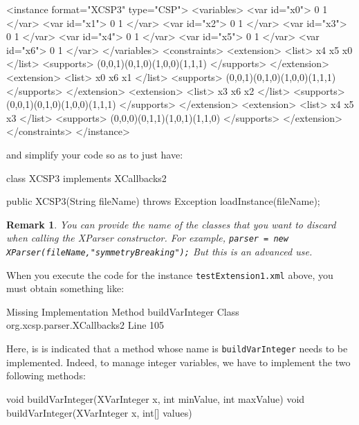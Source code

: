 \documentclass[10pt]{article}
\newenvironment{boxabsc}
               {\medskip \begin{bclogo}[barre=none,arrondi=0.2,logo=]{}\vspace{-0.6cm}}
               {\vspace{-0.1cm}\end{bclogo} \smallskip}
\newtheorem{remark}{Remark}
\newcommand{\nn}[1]{{\tt #1}} %
\begin{document}
\begin{boxabsc}
\begin{absc}
<instance format="XCSP3" type="CSP">
  <variables>
    <var id="x0"> 0 1 </var>
    <var id="x1"> 0 1 </var>
    <var id="x2"> 0 1 </var>
    <var id="x3"> 0 1 </var>
    <var id="x4"> 0 1 </var>
    <var id="x5"> 0 1 </var>
    <var id="x6"> 0 1 </var>
  </variables>
  <constraints>
    <extension>
      <list> x4 x5 x0 </list>
      <supports> (0,0,1)(0,1,0)(1,0,0)(1,1,1) </supports>
    </extension>
    <extension>
      <list> x0 x6 x1 </list>
      <supports> (0,0,1)(0,1,0)(1,0,0)(1,1,1) </supports>
    </extension>
    <extension>
      <list> x3 x6 x2 </list>
      <supports> (0,0,1)(0,1,0)(1,0,0)(1,1,1) </supports>
    </extension>
    <extension>
      <list> x4 x5 x3 </list>
      <supports> (0,0,0)(0,1,1)(1,0,1)(1,1,0) </supports>
    </extension>
  </constraints>
</instance>
\end{absc} 
\end{boxabsc}

and simplify your code so as to just have:

\begin{boxabsc}
\begin{absc}
class XCSP3 implements XCallbacks2 { 

  public XCSP3(String fileName) throws Exception {
    loadInstance(fileName); 
  }
}  
\end{absc} 
\end{boxabsc}

\begin{remark}
You can provide the name of the classes that you want to discard when calling the XParser constructor. For example, \verb!parser = new XParser(fileName,"symmetryBreaking");! But this is an advanced use.
\end{remark}

When you execute the code for the instance \nn{testExtension1.xml} above, you must obtain something like:

\begin{boxabsc}
\begin{void}
Missing Implementation
  Method buildVarInteger
  Class org.xcsp.parser.XCallbacks2
  Line 105
\end{void} 
\end{boxabsc}	

Here, is is indicated that a method whose name is \nn{buildVarInteger} needs to be implemented.
Indeed, to manage integer variables, we have to implement the two following methods:
\begin{boxabsc}
\begin{absc}
void buildVarInteger(XVarInteger x, int minValue, int maxValue)
void buildVarInteger(XVarInteger x, int[] values)
\end{absc} 
\end{boxabsc}
\end{document}
